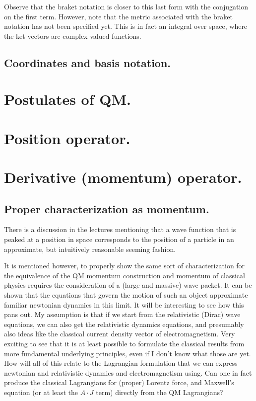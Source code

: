 \documentclass{article}
\begin{document}
Observe that the braket notation is closer to this last form with the conjugation on the first term.  However, note that the metric associated with the braket notation has not been specified yet.  This is in fact an integral over space, where the ket vectors are complex valued functions.

\subsection{ Coordinates and basis notation. }

\section{ Postulates of QM. }



\section{ Position operator. }

\section{ Derivative (momentum) operator. }

\subsection{ Proper characterization as momentum. }

There is a discussion in the lectures mentioning that a wave function that is peaked at a position in space
corresponds to the position of a particle in an approximate, but intuitively reasonable seeming fashion.

It is mentioned however, to properly show the same sort of characterization for the 
equivalence of the QM momentum construction and momentum of classical
physics requires the consideration of a (large and massive) wave packet.  It can be shown that the equations that
govern the motion
of such an object approximate familiar newtonian dynamics in this limit.  It will be interesting to see how
this pans out.  My assumption is that if we start from the relativistic (Dirac) wave equations, we can also
get the relativistic dynamics equations, and presumably also ideas like the classical current density vector
of electromagnetism.  Very exciting to see that it is at least possible to formulate the classical results from
more fundamental underlying principles, even if I don't know what those are yet.  How will all of this relate 
to the Lagrangian formulation that we can express newtonian and relativistic dynamics and electromagnetism using.
Can one in fact produce the classical Lagrangians for (proper) Lorentz force, and Maxwell's equation (or at least the $A \cdot J$ term) directly from the QM Lagrangians?

%
%
\end{document}

